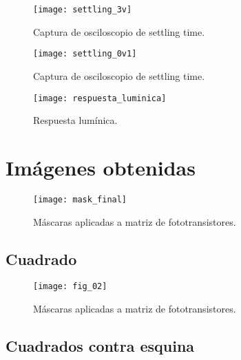             \begin{figure}[hbtp]
                \centering
                \texttt{[image: settling\_3v]}
                \caption{Captura de osciloscopio de settling time.}
                \label{fig:settling_3v}
            \end{figure}
            
            \begin{figure}[hbtp]
                \centering
                \texttt{[image: settling\_0v1]}
                \caption{Captura de osciloscopio de settling time.}
                \label{fig:settling_0v1}
            \end{figure} 
            
            \begin{figure}[hbtp]
                \centering
                \texttt{[image: respuesta\_luminica]}
                \caption{Respuesta lumínica.}
                \label{fig:respuesta_luminica}
            \end{figure}            
            
            
\newpage
\section{Imágenes obtenidas}

            \begin{figure}[hbtp]
                \centering
                \texttt{[image: mask\_final]}
                \caption{Máscaras aplicadas a matriz de fototransistores.}
                \label{fig:mask_final}
            \end{figure}  
\newpage
\subsection{Cuadrado}

            \begin{figure}[hbtp]
                \centering
                \texttt{[image: fig\_02]}
                \caption{Máscaras aplicadas a matriz de fototransistores.}
                \label{fig:fig_02}
            \end{figure} 
\newpage            
\subsection{Cuadrados contra esquina}

